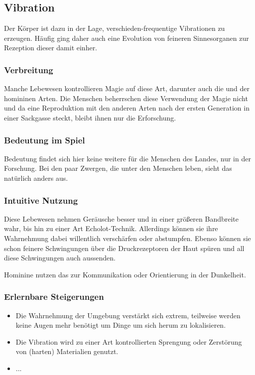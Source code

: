 \subsection{Vibration}\label{sec:vibrationsmagie}
Der Körper ist dazu in der Lage, verschieden-frequentige Vibrationen zu erzeugen. Häufig ging daher auch eine Evolution von feineren Sinnesorganen zur Rezeption dieser damit einher.

\subsubsection{Verbreitung}
Manche Lebewesen kontrollieren Magie auf diese Art, darunter auch die  und  der homininen Arten. Die Menschen beherrschen diese Verwendung der Magie nicht und da eine Reproduktion mit den anderen Arten nach der ersten Generation in einer Sackgasse steckt, bleibt ihnen nur die Erforschung.

\subsubsection{Bedeutung im Spiel}
Bedeutung findet sich hier keine weitere für die Menschen des Landes, nur in der Forschung. Bei den paar Zwergen, die unter den Menschen leben, sieht das natürlich anders aus.

\subsubsection{Intuitive Nutzung}
Diese Lebewesen nehmen Geräusche besser und in einer größeren Bandbreite wahr, bis hin zu einer Art Echolot-Technik. Allerdings können sie ihre Wahrnehmung dabei willentlich verschärfen oder abstumpfen. Ebenso können sie schon feinere Schwingungen über die Druckrezeptoren der Haut spüren und all diese Schwingungen auch aussenden.

Hominine nutzen das zur Kommunikation oder Orientierung in der Dunkelheit. 

\subsubsection{Erlernbare Steigerungen}
\begin{itemize}
	\item Die Wahrnehmung der Umgebung verstärkt sich extrem, teilweise werden keine Augen mehr benötigt um Dinge um sich herum zu lokalisieren. 
	\item Die Vibration wird zu einer Art kontrollierten Sprengung oder Zerstörung von (harten) Materialien genutzt.
	\item ...
\end{itemize}

